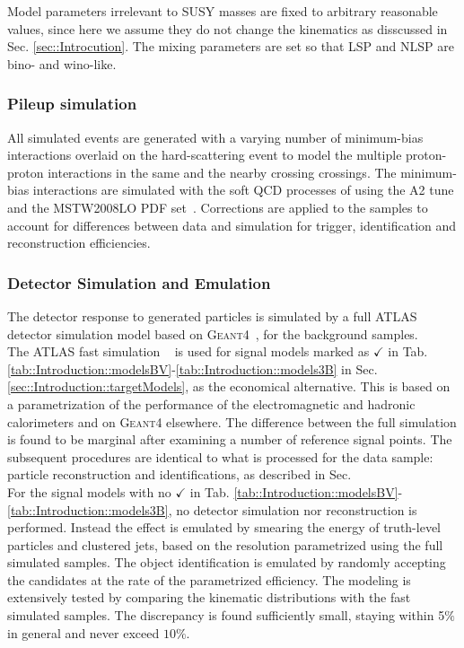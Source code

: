 Model parameters irrelevant to SUSY masses are fixed to arbitrary reasonable values, 
since here we assume they do not change the kinematics as disscussed in Sec. \ref{sec::Introcution}.
The mixing parameters are set so that LSP and NLSP are bino- and wino-like. \\



\subsubsection{Pileup simulation}
All simulated events are generated with a varying number of minimum-bias interactions overlaid on the hard-scattering event to model the multiple proton-proton interactions in the same and the nearby crossing crossings.
The minimum-bias interactions are simulated with the soft QCD processes of  using the A2 tune \cite{ATLAS:2012uec} and the MSTW2008LO PDF set~\cite{Martin:2009iq}. 
Corrections are applied to the samples to account for differences between data and simulation for trigger, identification and reconstruction efficiencies. \\



\subsubsection{Detector Simulation and Emulation}
The detector response to generated particles is simulated by a full ATLAS detector simulation model \cite{ATLASFullSimu:2010wqa} based on \textsc{Geant4}~\cite{Agostinelli:2002hh}, for the background samples. \\

The ATLAS fast simulation ~\cite{atlfast} is used for signal models marked as $\checkmark$ in Tab. \ref{tab::Introduction::modelsBV}-\ref{tab::Introduction::models3B} in Sec. \ref{sec::Introduction::targetModels}, as the economical alternative. This is based on a parametrization of the performance of the electromagnetic and hadronic calorimeters and on \textsc{Geant4} elsewhere. The difference between the full simulation is found to be marginal after examining a number of reference signal points.
The subsequent procedures are identical to what is processed for the data sample: particle reconstruction and identifications, as described in Sec. \\

For the signal models with no $\checkmark$ in Tab. \ref{tab::Introduction::modelsBV}-\ref{tab::Introduction::models3B}, no detector simulation nor reconstruction is performed. Instead the effect is emulated by smearing the energy of truth-level particles and clustered jets, based on the resolution parametrized using the full simulated samples. The object identification is emulated by randomly accepting the candidates at the rate of the parametrized efficiency. The modeling is extensively tested by comparing the kinematic distributions with the fast simulated samples. The discrepancy is found sufficiently small, staying within 5$\%$ in general and never exceed $10\%$. \\

